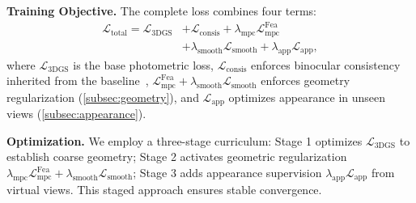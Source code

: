 \noindent\textbf{Training Objective.} The complete loss combines four terms:
  \begin{equation}
    \begin{split}
    \mathcal{L}_{\text{total}} = 
    \mathcal{L}_{\text{3DGS}} 
    &+ \mathcal{L}_{\text{consis}} 
    + \lambda_{\text{mpc}} \mathcal{L}_{\text{mpc}}^{\text{Fea}} \\
    &+ \lambda_{\text{smooth}} \mathcal{L}_{\text{smooth}} 
    + \lambda_{\text{app}} \mathcal{L}_{\text{app}},
    \end{split}
    \end{equation} 
    where $\mathcal{L}_{\text{3DGS}}$ is the base photometric loss, 
    $\mathcal{L}_{\text{consis}}$ enforces binocular consistency inherited from the baseline~\cite{han2024binocular}, 
    $\mathcal{L}_{\text{mpc}}^{\text{Fea}} + \lambda_{\text{smooth}}\mathcal{L}_{\text{smooth}}$ enforces geometry regularization (\cref{subsec:geometry}), 
    and $\mathcal{L}_{\text{app}}$ optimizes appearance in unseen views (\cref{subsec:appearance}).

\noindent\textbf{Optimization.}
We employ a three-stage curriculum: Stage 1 optimizes $\mathcal{L}_{\text{3DGS}}$ to establish coarse geometry; Stage 2  activates geometric regularization $\lambda_{\text{mpc}}  \mathcal{L}_{\text{mpc}}^{\text{Fea}} + \lambda_{\text{smooth}}\mathcal{L}_{\text{smooth}}$; 
Stage 3 adds appearance supervision $\lambda_{\text{app}} \mathcal{L}_{\text{app}}$ from virtual views. 
This staged approach ensures stable convergence.





